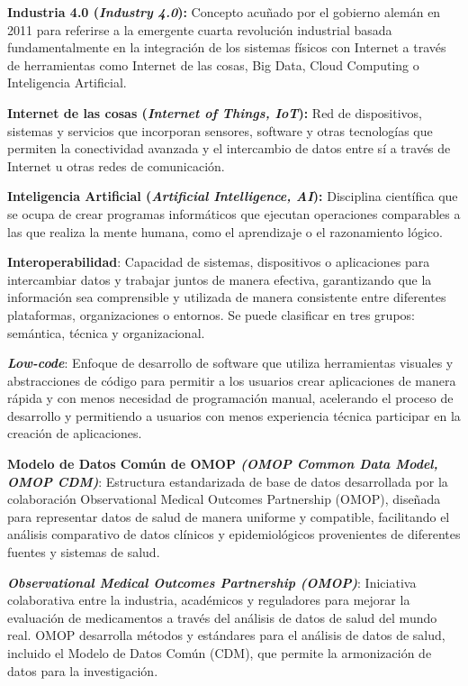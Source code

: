 \textbf{Industria 4.0 (\textit{Industry 4.0}):} Concepto acuñado por el gobierno alemán en 2011 para referirse a la emergente cuarta revolución industrial basada fundamentalmente en la integración de los sistemas físicos con Internet a través de herramientas como Internet de las cosas, Big Data, Cloud Computing o Inteligencia Artificial.

\textbf{Internet de las cosas (\textit{Internet of Things, IoT}):} Red de dispositivos, sistemas y servicios que incorporan sensores, software y otras tecnologías que permiten la conectividad avanzada y el intercambio de datos entre sí a través de Internet u otras redes de comunicación.

\textbf{Inteligencia Artificial (\textit{Artificial Intelligence, AI}):} Disciplina científica que se ocupa de crear programas informáticos que ejecutan operaciones comparables a las que realiza la mente humana, como el aprendizaje o el razonamiento lógico.


\textbf{Interoperabilidad}: Capacidad de sistemas, dispositivos o aplicaciones para intercambiar datos y trabajar juntos de manera efectiva, garantizando que la información sea comprensible y utilizada de manera consistente entre diferentes plataformas, organizaciones o entornos. Se puede clasificar en tres grupos: semántica, técnica y organizacional.





\textbf{\textit{Low-code}}: Enfoque de desarrollo de software que utiliza herramientas visuales y abstracciones de código para permitir a los usuarios crear aplicaciones de manera rápida y con menos necesidad de programación manual, acelerando el proceso de desarrollo y permitiendo a usuarios con menos experiencia técnica participar en la creación de aplicaciones.


\textbf{Modelo de Datos Común de OMOP \textit{(OMOP Common Data Model, OMOP CDM)}}: Estructura estandarizada de base de datos desarrollada por la colaboración Observational Medical Outcomes Partnership (OMOP), diseñada para representar datos de salud de manera uniforme y compatible, facilitando el análisis comparativo de datos clínicos y epidemiológicos provenientes de diferentes fuentes y sistemas de salud.





\textit{\textbf{Observational Medical Outcomes Partnership (OMOP)}}: Iniciativa colaborativa entre la industria, académicos y reguladores para mejorar la evaluación de medicamentos a través del análisis de datos de salud del mundo real. OMOP desarrolla métodos y estándares para el análisis de datos de salud, incluido el Modelo de Datos Común (CDM), que permite la armonización de datos para la investigación.


